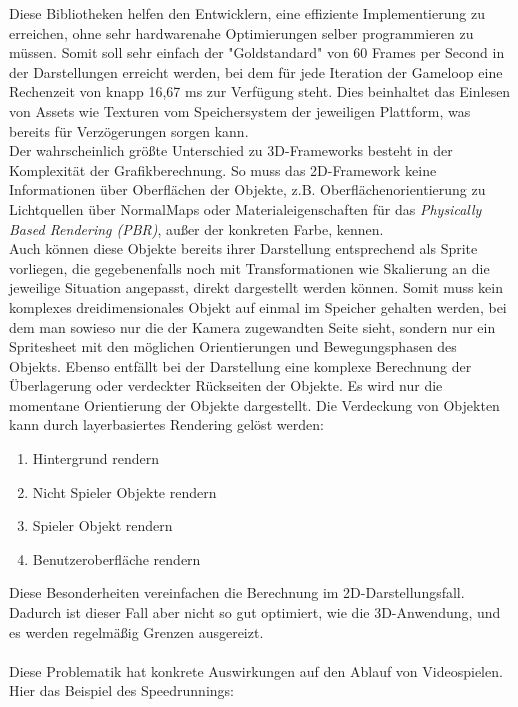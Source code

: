 Diese Bibliotheken helfen den Entwicklern, eine effiziente Implementierung zu erreichen, ohne sehr hardwarenahe Optimierungen selber programmieren zu müssen. Somit soll sehr einfach der "Goldstandard" von 60 Frames per Second in der Darstellungen erreicht werden, bei dem für jede Iteration der Gameloop eine Rechenzeit von knapp 16,67 ms zur Verfügung steht. Dies beinhaltet das Einlesen von Assets wie Texturen vom Speichersystem der jeweiligen Plattform, was bereits für Verzögerungen sorgen kann.\\ 
Der wahrscheinlich größte Unterschied zu 3D-Frameworks besteht in der Komplexität der Grafikberechnung. So muss das 2D-Framework keine Informationen über Oberflächen der Objekte, z.B. Oberflächenorientierung zu Lichtquellen über NormalMaps oder Materialeigenschaften für das \emph{Physically Based Rendering (PBR)}, außer der konkreten Farbe, kennen.\\
Auch können diese Objekte bereits ihrer Darstellung entsprechend als Sprite vorliegen, die gegebenenfalls noch mit Transformationen wie Skalierung an die jeweilige Situation  angepasst, direkt dargestellt werden können. Somit muss kein komplexes dreidimensionales Objekt auf einmal im Speicher gehalten werden, bei dem man sowieso nur die der Kamera zugewandten Seite sieht, sondern nur ein Spritesheet mit den möglichen Orientierungen und Bewegungsphasen des Objekts.
Ebenso entfällt bei der Darstellung eine komplexe Berechnung der Überlagerung oder verdeckter Rückseiten der Objekte. Es wird nur die momentane Orientierung der Objekte dargestellt. Die Verdeckung von Objekten kann durch layerbasiertes Rendering gelöst werden:
\begin{enumerate}
\item Hintergrund rendern\\
\item Nicht Spieler Objekte rendern\\
\item Spieler Objekt rendern\\
\item Benutzeroberfläche rendern\\
\end{enumerate}
Diese Besonderheiten vereinfachen die Berechnung im 2D-Darstellungsfall. Dadurch ist dieser Fall aber nicht so gut optimiert, wie die 3D-Anwendung, und es werden regelmäßig Grenzen ausgereizt.\\
\\
Diese Problematik hat konkrete Auswirkungen auf den Ablauf von Videospielen. Hier das Beispiel des Speedrunnings:

